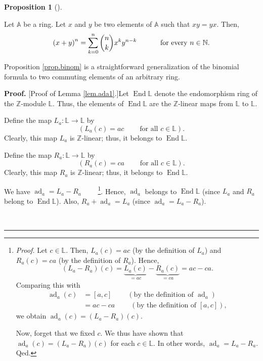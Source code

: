 \documentclass[numbers=enddot,12pt,final,onecolumn,notitlepage]{scrartcl}%
\theoremstyle{definition}
\newtheorem{prop}[theo]{Proposition}
\newenvironment{proposition}[1][]
{\begin{prop}[#1]\begin{leftbar}}
{\end{leftbar}\end{prop}}
\newenvironment{proof}[1][Proof]{\noindent\textbf{#1.} }{\ \rule{0.5em}{0.5em}}
\let\sumnonlimits\sum
\renewcommand{\sum}{\sumnonlimits\limits}
\begin{document}
\begin{proposition}
\label{prop.binom}Let $\mathbb{A}$ be a ring. Let $x$ and $y$ be two elements
of $\mathbb{A}$ such that $xy=yx$. Then,%
\[
\left(  x+y\right)  ^{n}=\sum_{k=0}^{n}\dbinom{n}{k}x^{k}y^{n-k}%
\ \ \ \ \ \ \ \ \ \ \text{for every }n\in\mathbb{N}\text{.}%
\]

\end{proposition}

Proposition \ref{prop.binom} is a straightforward generalization of the
binomial formula to two commuting elements of an arbitrary ring.

\begin{proof}
[Proof of Lemma \ref{lem.ada1}.]Let $\operatorname*{End}\mathbb{L}$ denote the
endomorphism ring of the $\mathbb{Z}$-module $\mathbb{L}$. Thus, the elements
of $\operatorname*{End}\mathbb{L}$ are the $\mathbb{Z}$-linear maps from
$\mathbb{L}$ to $\mathbb{L}$.

Define the map $L_{a}:\mathbb{L}\rightarrow\mathbb{L}$ by%
\[
\left(  L_{a}\left(  c\right)  =ac\ \ \ \ \ \ \ \ \ \ \text{for all }%
c\in\mathbb{L}\right)  .
\]
Clearly, this map $L_{a}$ is $\mathbb{Z}$-linear; thus, it belongs to
$\operatorname*{End}\mathbb{L}$.

Define the map $R_{a}:\mathbb{L}\rightarrow\mathbb{L}$ by%
\[
\left(  R_{a}\left(  c\right)  =ca\ \ \ \ \ \ \ \ \ \ \text{for all }%
c\in\mathbb{L}\right)  .
\]
Clearly, this map $R_{a}$ is $\mathbb{Z}$-linear; thus, it belongs to
$\operatorname*{End}\mathbb{L}$.

We have $\operatorname*{ad}\nolimits_{a}=L_{a}-R_{a}$%
\ \ \ \ \footnote{\textit{Proof.} Let $c\in\mathbb{L}$. Then, $L_{a}\left(
c\right)  =ac$ (by the definition of $L_{a}$) and $R_{a}\left(  c\right)  =ca$
(by the definition of $R_{a}$). Hence,
\[
\left(  L_{a}-R_{a}\right)  \left(  c\right)  =\underbrace{L_{a}\left(
c\right)  }_{=ac}-\underbrace{R_{a}\left(  c\right)  }_{=ca}=ac-ca.
\]
Comparing this with%
\begin{align*}
\operatorname*{ad}\nolimits_{a}\left(  c\right)   &  =\left[  a,c\right]
\ \ \ \ \ \ \ \ \ \ \left(  \text{by the definition of }\operatorname*{ad}%
\nolimits_{a}\right) \\
&  =ac-ca\ \ \ \ \ \ \ \ \ \ \left(  \text{by the definition of }\left[
a,c\right]  \right)  ,
\end{align*}
we obtain $\operatorname*{ad}\nolimits_{a}\left(  c\right)  =\left(
L_{a}-R_{a}\right)  \left(  c\right)  $.
\par
Now, forget that we fixed $c$. We thus have shown that $\operatorname*{ad}%
\nolimits_{a}\left(  c\right)  =\left(  L_{a}-R_{a}\right)  \left(  c\right)
$ for each $c\in\mathbb{L}$. In other words, $\operatorname*{ad}%
\nolimits_{a}=L_{a}-R_{a}$. Qed.}. Hence, $\operatorname*{ad}\nolimits_{a}$
belongs to $\operatorname*{End}\mathbb{L}$ (since $L_{a}$ and $R_{a}$ belong
to $\operatorname*{End}\mathbb{L}$). Also, $R_{a}+\operatorname*{ad}%
\nolimits_{a}=L_{a}$ (since $\operatorname*{ad}\nolimits_{a}=L_{a}-R_{a}$).


\end{proof}
\end{document}
